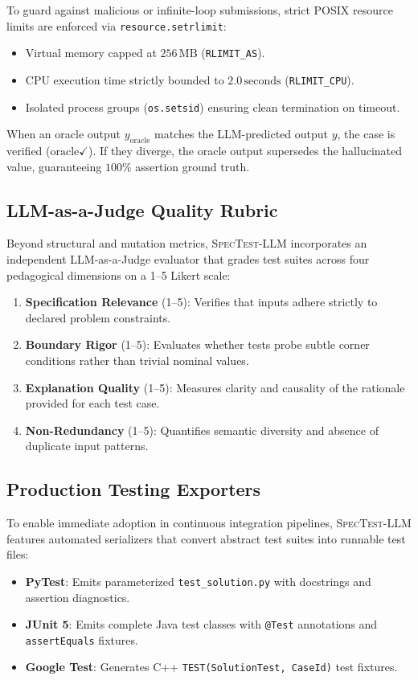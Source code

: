 \documentclass[conference]{IEEEtran}
\begin{document}
To guard against malicious or infinite-loop submissions, strict POSIX resource limits are enforced via \texttt{resource.setrlimit}:
\begin{itemize}
    \item Virtual memory capped at $256\,\text{MB}$ (\texttt{RLIMIT\_AS}).
    \item CPU execution time strictly bounded to $2.0\,\text{seconds}$ (\texttt{RLIMIT\_CPU}).
    \item Isolated process groups (\texttt{os.setsid}) ensuring clean termination on timeout.
\end{itemize}
When an oracle output $y_{\text{oracle}}$ matches the LLM-predicted output $y$, the case is verified ($\text{oracle} \checkmark$). If they diverge, the oracle output supersedes the hallucinated value, guaranteeing $100\%$ assertion ground truth.

\subsection{LLM-as-a-Judge Quality Rubric}
Beyond structural and mutation metrics, \textsc{SpecTest-LLM} incorporates an independent LLM-as-a-Judge evaluator that grades test suites across four pedagogical dimensions on a 1--5 Likert scale:
\begin{enumerate}
    \item \textbf{Specification Relevance} (1--5): Verifies that inputs adhere strictly to declared problem constraints.
    \item \textbf{Boundary Rigor} (1--5): Evaluates whether tests probe subtle corner conditions rather than trivial nominal values.
    \item \textbf{Explanation Quality} (1--5): Measures clarity and causality of the rationale provided for each test case.
    \item \textbf{Non-Redundancy} (1--5): Quantifies semantic diversity and absence of duplicate input patterns.
\end{enumerate}

\subsection{Production Testing Exporters}
To enable immediate adoption in continuous integration pipelines, \textsc{SpecTest-LLM} features automated serializers that convert abstract test suites into runnable test files:
\begin{itemize}
    \item \textbf{PyTest}: Emits parameterized \texttt{test\_solution.py} with docstrings and assertion diagnostics.
    \item \textbf{JUnit 5}: Emits complete Java test classes with \texttt{@Test} annotations and \texttt{assertEquals} fixtures.
    \item \textbf{Google Test}: Generates C++ \texttt{TEST(SolutionTest, CaseId)} test fixtures.
\end{itemize}
\end{document}
